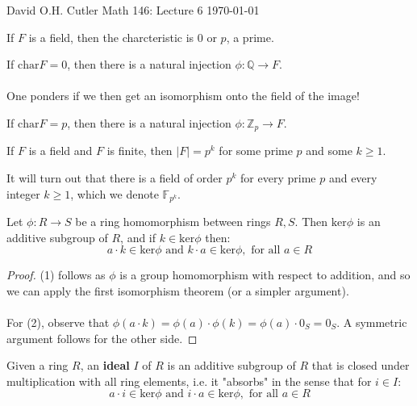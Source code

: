 \documentclass[12pt]{article}
\newenvironment{theorem}[2][Theorem]{\begin{trivlist}
    \item[\hskip \labelsep {\bfseries #1}\hskip \labelsep {\bfseries #2.}]}{\end{trivlist}}
\newenvironment{lemma}[2][Lemma]{\begin{trivlist}
    \item[\hskip \labelsep {\bfseries #1}\hskip \labelsep {\bfseries #2.}]}{\end{trivlist}}
\newenvironment{definition}[2][Definition]{\begin{trivlist}
    \item[\hskip \labelsep {\bfseries #1}\hskip \labelsep {\bfseries #2.}]}{\end{trivlist}}
\begin{document}
\noindent David O.H. Cutler \hfill {\Large Math 146: Lecture 6} \hfill \today

\begin{lemma}{1}
    If $F$ is a field, then the charcteristic is 0 or $p$, a prime.
\end{lemma}

\begin{theorem}{2}
    If $\text{char} F = 0$, then there is a natural injection $\phi : \mathbb{Q} \rightarrow F$. 
    \\ \\
    One ponders if we then get an isomorphism onto the field of the image!
\end{theorem}

\begin{theorem}{3}
    If $\text{char} F = p$, then there is a natural injection $\phi : \mathbb{Z}_p \rightarrow F$.
\end{theorem}

\begin{lemma}{4}
    If $F$ is a field and $F$ is finite, then $|F| = p^k$ for some prime $p$ and some $k \geq 1$.
\end{lemma}

It will turn out that there is a field of order $p^k$ for every prime $p$ and every integer $k \geq 1$, which we denote $\mathbb{F}_{p^k}$.

\begin{lemma}{5}
    Let $\phi : R \rightarrow S$ be a ring homomorphism between rings $R, S$. Then $\text{ker}\phi$ is an additive subgroup of $R$, and if $k \in \text{ker}\phi$ then:
    $$a \cdot k \in \text{ker}\phi \text{ and } k \cdot a \in \text{ker}\phi, \text{ for all } a \in R$$
    \begin{proof}
        (1) follows as $\phi$ is a group homomorphism with respect to addition, and so we can apply the first isomorphism theorem (or a simpler argument). \\ \\
        For (2), observe that $\phi(a \cdot k) = \phi(a) \cdot \phi(k) = \phi(a) \cdot 0_S = 0_S$. A symmetric argument follows for the other side.
    \end{proof}
\end{lemma}

\begin{definition}{(Ideal)}
    Given a ring $R$, an \textbf{ideal} $I$ of $R$ is an additive subgroup of $R$ that is closed under multiplication with all ring elements, i.e. it "absorbs" in the sense that for $i \in I$:
    $$a \cdot i \in \text{ker}\phi \text{ and } i \cdot a \in \text{ker}\phi, \text{ for all } a \in R$$
\end{definition}
\end{document}
